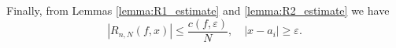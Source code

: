 Finally, from Lemmas \ref{lemma:R1_estimate} and \ref{lemma:R2_estimate} we have
\begin{equation} \label{R_estimate}
\left|R_{n,N}(f,x)\right|\leq \frac{c(f,\varepsilon)}{N}, \quad |x - a_i| \geq \varepsilon.
\end{equation}

